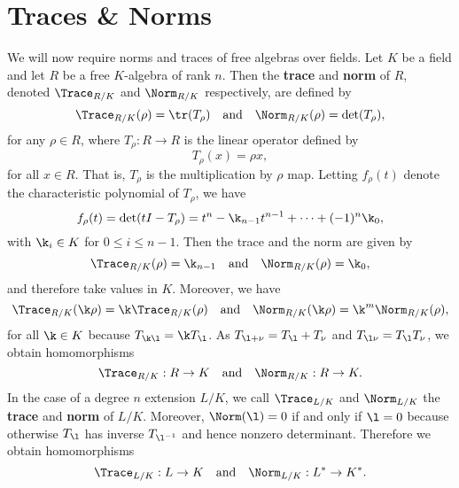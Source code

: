   \section{Traces \& Norms}
    We will now require norms and traces of free algebras over fields. Let $K$ be a field and let $R$ be a free $K$-algebra of rank $n$. Then the \textbf{trace} and \textbf{norm} of $R$, denoted $\Trace_{R/K}$ and $\Norm_{R/K}$ respectively, are defined by
    \[
      \Trace_{R/K}(\rho) = \tr(T_{\rho}) \quad \text{and} \quad \Norm_{R/K}(\rho) = \det(T_{\rho}),
    \]
    for any $\rho \in R$, where $T_{\rho}:R \to R$ is the linear operator defined by
    \[
      T_{\rho}(x) = \rho x,
    \]
    for all $x \in R$. That is, $T_{\rho}$ is the multiplication by $\rho$ map. Letting $f_{\rho}(t)$ denote the characteristic polynomial of $T_{\rho}$, we have
    \[
      f_{\rho}(t) = \det(tI-T_{\rho}) = t^{n}-\k_{n-1}t^{n-1}+\cdots+(-1)^{n}\k_{0},
    \]
    with $\k_{i} \in K$ for $0 \le i \le n-1$. Then the trace and the norm are given by
    \begin{equation}\label{equ:trace_and_norm_characteristic_polynomial}
      \Trace_{R/K}(\rho) = \k_{n-1} \quad \text{and} \quad \Norm_{R/K}(\rho) = \k_{0},
    \end{equation}
    and therefore take values in $K$. Moreover, we have
    \[
      \Trace_{R/K}(\k\rho) = \k\Trace_{R/K}(\rho) \quad \text{and} \quad \Norm_{R/K}(\k\rho) = \k^{m}\Norm_{R/K}(\rho),
    \]
    for all $\k \in K$ because $T_{\k\l} = \k T_{\l}$. As $T_{\l+\nu} = T_{\l}+T_{\nu}$ and $T_{\l \nu} = T_{\l}T_{\nu}$, we obtain homomorphisms
    \[
      \Trace_{R/K}:R \to K \quad \text{and} \quad \Norm_{R/K}:R \to K.
    \]
    In the case of a degree $n$ extension $L/K$, we call $\Trace_{L/K}$ and $\Norm_{L/K}$ the \textbf{trace} and \textbf{norm} of $L/K$. Moreover, $\Norm(\l) = 0$ if and only if $\l = 0$ because otherwise $T_{\l}$ has inverse $T_{\l^{-1}}$ and hence nonzero determinant. Therefore we obtain homomorphisms
    \[
      \Trace_{L/K}:L \to K \quad \text{and} \quad \Norm_{L/K}:L^{\ast} \to K^{\ast}.
    \]
